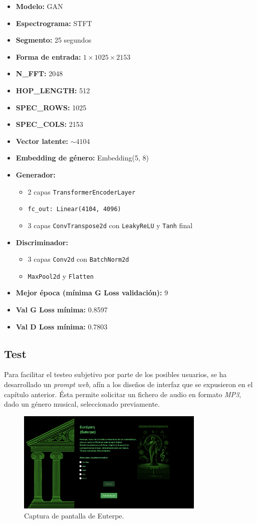 \begin{itemize}
  \item \textbf{Modelo:} GAN
  \item \textbf{Espectrograma:} STFT
  \item \textbf{Segmento:} 25 segundos
  \item \textbf{Forma de entrada:} $1 \times 1025 \times 2153$
  \item \textbf{N\_FFT:} 2048
  \item \textbf{HOP\_LENGTH:} 512
  \item \textbf{SPEC\_ROWS:} 1025
  \item \textbf{SPEC\_COLS:} 2153
  \item \textbf{Vector latente:} $\sim4104$
  \item \textbf{Embedding de género:} Embedding(5, 8)
  \item \textbf{Generador:}
  \begin{itemize}
    \item 2 capas \texttt{TransformerEncoderLayer}
    \item \texttt{fc\_out: Linear(4104, 4096)}
    \item 3 capas \texttt{ConvTranspose2d} con \texttt{LeakyReLU} y \texttt{Tanh} final
  \end{itemize}
  \item \textbf{Discriminador:}
  \begin{itemize}
    \item 3 capas \texttt{Conv2d} con \texttt{BatchNorm2d}
    \item \texttt{MaxPool2d} y \texttt{Flatten}
  \end{itemize}
  \item \textbf{Mejor época (mínima G Loss validación):} 9
  \item \textbf{Val G Loss mínima:} 0.8597
  \item \textbf{Val D Loss mínima:} 0.7803
\end{itemize}

\subsection{Test}

Para facilitar el testeo subjetivo por parte de los posibles usuarios, se ha desarrollado un \emph{prompt web}, afín a los diseños de interfaz que se expusieron en el capítulo anterior. Ésta permite solicitar un fichero de audio en formato \emph{MP3}, dado un género musical, seleccionado previamente.

\begin{figure}[H]
    \centering
    \includegraphics[width=0.8\textwidth]{images/euterpe-screenshot.png}
    \caption{Captura de pantalla de Euterpe.}
\end{figure}



